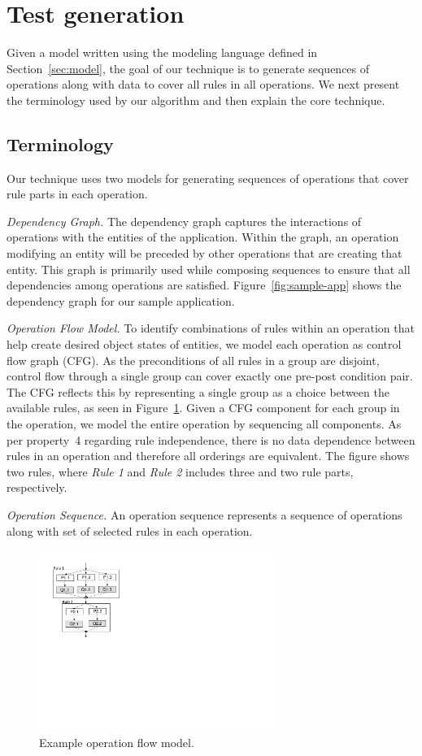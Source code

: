 \section{Test generation}

Given a model written using the modeling language defined in Section~\ref{sec:model},
the goal of our technique is to generate sequences of operations along with data to 
cover all rules in all operations. We next present the terminology used by our
algorithm and then explain the core technique.

\subsection{Terminology}

Our technique uses two models for generating sequences of operations that cover rule parts in 
each operation.

\textit{Dependency Graph.} The dependency graph captures the interactions of
operations with the entities of the application.
Within the graph, an operation modifying an entity will be preceded by 
other operations that are creating that entity. This graph is primarily used while
composing sequences to ensure that all dependencies among operations are satisfied.
Figure~\ref{fig:sample-app} shows the dependency graph for our sample application.

\textit{Operation Flow Model.} To identify combinations of rules within an operation
that help create desired object states of entities, we model each operation as control
flow graph (CFG). As the preconditions of all rules in
a group are disjoint, control flow through a single group can cover
exactly one pre-post condition pair. The CFG reflects this by
representing a single group as a choice between the available rules, as
seen in Figure~\ref{fig:cfg}. Given a CFG component for each group in
the operation, we model the entire operation by sequencing all
components. As per property~4 regarding rule independence,
there is no data dependence between rules in an operation and therefore
all orderings are equivalent. The figure shows two rules, where \textit{Rule 1}
and \textit{Rule 2} includes three and two rule parts, respectively.

\textit{Operation Sequence.} An operation sequence represents a sequence of operations
along with set of selected rules in each operation. 

\begin{figure}
\centering
\includegraphics[trim=45 310 430 38,clip,width=3in]{figs/cfg-example.pdf}
\caption{Example operation flow model.}
\label{fig:cfg}
\end{figure}

